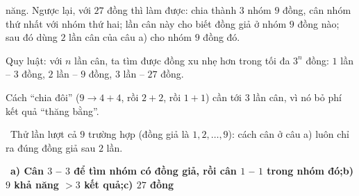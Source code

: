 \documentclass[11pt]{article}
\providecommand{\AnsWord}{Đáp số}
\newcommand{\ans}[1]{\par\smallskip{\bfseries\color{tmGreen!88!black}\AnsWord:}\ {\bfseries\color{AnsRed}#1}\par}
\newcommand{\verify}[1]{\par\smallskip\noindent{\bfseries\color{tmGreen!80!black}\faCheckCircle\ \CheckWord}\ #1\par}
\def\AnsWord{Đáp số}
\def\CheckWord{Thử lại:}
\begin{document}
{năng. Ngược lại, với $27$ đồng thì làm được: chia thành $3$ nhóm $9$ đồng, cân nhóm thứ nhất với nhóm thứ hai; lần cân này cho biết
đồng giả ở nhóm $9$ đồng nào; sau đó dùng $2$ lần cân của câu a) cho nhóm $9$ đồng đó.
\begin{tipbox}Quy luật: với $n$ lần cân, ta tìm được đồng xu nhẹ hơn trong tối đa $3^n$ đồng: $1$ lần -- $3$ đồng, $2$ lần -- $9$
đồng, $3$ lần -- $27$ đồng.\end{tipbox}
\begin{warnbox}Cách ``chia đôi'' ($9 \to 4 + 4$, rồi $2 + 2$, rồi $1 + 1$) cần tới $3$ lần cân, vì nó bỏ phí kết quả ``thăng
bằng''.\end{warnbox}
\verify{Thử lần lượt cả $9$ trường hợp (đồng giả là $1, 2, \dots, 9$): cách cân ở câu a) luôn chỉ ra đúng đồng giả sau $2$ lần.}
\ans{a) Cân $3$ -- $3$ để tìm nhóm có đồng giả, rồi cân $1$ -- $1$ trong nhóm đó;\quad b) $9$ khả năng $> 3$ kết quả;\quad c) $27$ đồng}
}
\end{document}

